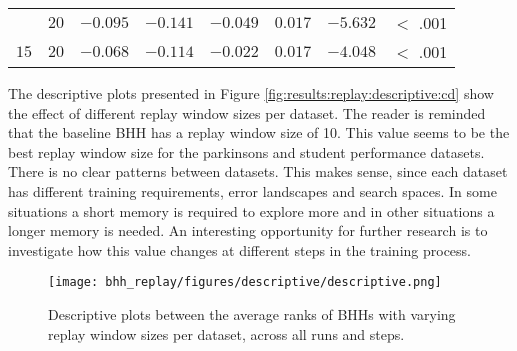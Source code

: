 \begin{table}[htbp]
{\begin{tabular}{lrrrrrrr}
			$ $                  & $20$                 & $-0.095$             & $-0.141$                                        & $-0.049$             & $0.017$              & $-5.632$             & $<$ .001    \\
			$15$                 & $20$                 & $-0.068$             & $-0.114$                                        & $-0.022$             & $0.017$              & $-4.048$             & $<$ .001    \\
			\bottomrule
		\end{tabular}
	}
\end{table}


The descriptive plots presented in Figure \ref{fig:results:replay:descriptive:cd} show the effect of different replay window sizes per dataset. The reader is reminded that the baseline \Ac{BHH} has a replay window size of 10. This value seems to be the best replay window size for the parkinsons and student performance datasets. There is no clear patterns between datasets. This makes sense, since each dataset has different training requirements, error landscapes and search spaces. In some situations a short memory is required to explore more and in other situations a longer memory is needed. An interesting opportunity for further research is to investigate how this value changes at different steps in the training process.

\begin{figure}[htbp]
	\centering
	\texttt{[image: bhh\_replay/figures/descriptive/descriptive.png]}
	\caption{Descriptive plots between the average ranks of \Acsp{BHH} with varying replay window sizes per dataset, across all runs and steps.}
	\label{fig:results:replay:descriptive:descriptive}
\end{figure}

